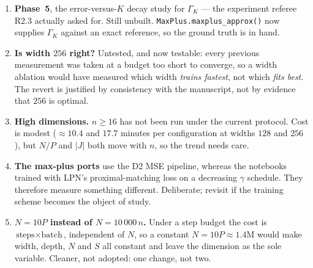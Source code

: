 \documentclass[11pt]{article}
\newcommand{\file}[1]{\texttt{#1}}
\newcommand{\abs}[1]{\left\vert #1 \right\vert}
\newcommand{\OPEN}{\textcolor{orange!80!black}{\textbf{[open]}}}
\begin{document}
\begin{enumerate}
  \item[\OPEN] \textbf{Phase~5}, the error-versus-$K$ decay study for
    $\Gamma_{K}$ --- the experiment referee R2.3 actually asked for. Still
    unbuilt. \file{MaxPlus.maxplus\_approx()} now supplies $\Gamma_{K}$ against
    an exact reference, so the ground truth is in hand.
  \item[\OPEN] \textbf{Is width $256$ right?} Untested, and now testable: every
    previous measurement was taken at a budget too short to converge, so a width
    ablation would have measured which width \emph{trains fastest}, not which
    \emph{fits best}. The revert is justified by consistency with the manuscript,
    not by evidence that $256$ is optimal.
  \item[\OPEN] \textbf{High dimensions.} $n\geqslant16$ has not been run under
    the current protocol. Cost is modest ($\approx10.4$ and $17.7$ minutes per
    configuration at widths $128$ and $256$), but $N/P$ and $\abs{J}$ both move
    with $n$, so the trend needs care.
  \item[\OPEN] \textbf{The max-plus ports} use the D2 MSE pipeline, whereas the
    notebooks trained with LPN's proximal-matching loss on a decreasing $\gamma$
    schedule. They therefore measure something different. Deliberate; revisit if
    the training scheme becomes the object of study.
  \item[\OPEN] \textbf{$N=10P$ instead of $N=10\,000\,n$.} Under a step budget the
    cost is $\text{steps}\times\text{batch}$, independent of $N$, so a constant
    $N=10P\approx1.4$M would make width, depth, $N$ and $S$ all constant and
    leave the dimension as the sole variable. Cleaner, not adopted: one change,
    not two.
\end{enumerate}
\end{document}

